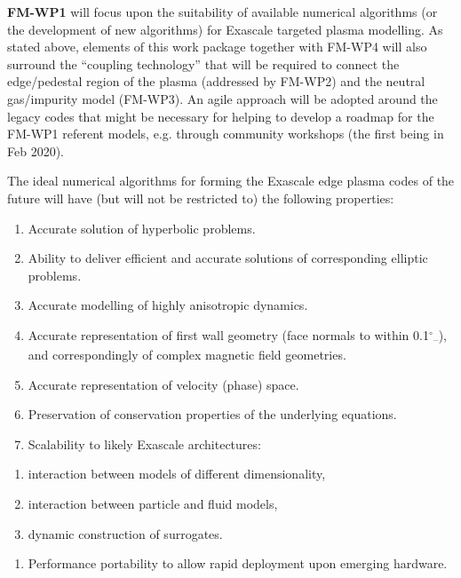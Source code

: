 \textbf{FM-WP1} will focus upon the suitability of available numerical 
algorithms (or the development of new algorithms)
for Exascale targeted plasma modelling. As stated above, elements of this work 
package together with FM-WP4 will also
surround the ``coupling technology'' that will be required to connect the 
edge/pedestal region of the plasma (addressed
by FM-WP2) and the neutral gas/impurity model (FM-WP3). An agile approach will 
be adopted around the legacy codes that
might be necessary for helping to develop a roadmap for the FM-WP1 referent 
models, e.g. through community workshops
(the first being in Feb 2020).

The ideal numerical algorithms for forming the Exascale edge plasma codes of 
the future will have (but will not be
restricted to) the following properties:


\bigskip


\bigskip

\liststyleWWNumviii
\begin{enumerate}
\item %
Accurate solution of hyperbolic problems.
\item Ability to deliver efficient and accurate solutions of corresponding 
elliptic problems.
\item Accurate modelling of highly anisotropic dynamics. 
\item Accurate representation of first wall geometry (face normals to within 
0.1$^\circ$\textsubscript{--}), and
correspondingly of complex magnetic field geometries.
\item Accurate representation of velocity (phase) space.
\item Preservation of conservation properties of the underlying equations.
\item Scalability to likely Exascale architectures:
\end{enumerate}
\liststyleWWNumxiii
\begin{enumerate}
\item interaction between models of different dimensionality,
\item interaction between particle and fluid models,
\item dynamic construction of surrogates.
\end{enumerate}
\liststyleWWNumviii
\begin{enumerate}
\item Performance portability to allow rapid deployment upon emerging hardware.
\end{enumerate}

